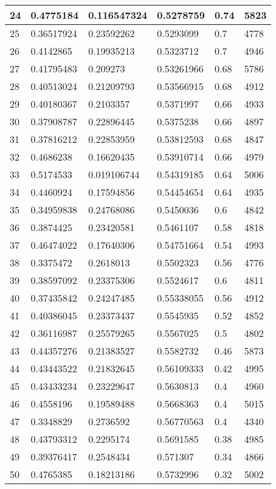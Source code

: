 \begin{longtable}{|l|l|l|l|l|l|}
24 & 0.4775184 & 0.116547324 & 0.5278759 & 0.74 & 5823 \\ \hline 
25 & 0.36517924 & 0.23592262 & 0.5293099 & 0.7 & 4778 \\ \hline 
26 & 0.4142865 & 0.19935213 & 0.5323712 & 0.7 & 4946 \\ \hline 
27 & 0.41795483 & 0.209273 & 0.53261966 & 0.68 & 5786 \\ \hline 
28 & 0.40513024 & 0.21209793 & 0.53566915 & 0.68 & 4912 \\ \hline 
29 & 0.40180367 & 0.2103357 & 0.5371997 & 0.66 & 4933 \\ \hline 
30 & 0.37908787 & 0.22896445 & 0.5375238 & 0.66 & 4897 \\ \hline 
31 & 0.37816212 & 0.22853959 & 0.53812593 & 0.68 & 4847 \\ \hline 
32 & 0.4686238 & 0.16620435 & 0.53910714 & 0.66 & 4979 \\ \hline 
33 & 0.5174533 & 0.019106744 & 0.54319185 & 0.64 & 5006 \\ \hline 
34 & 0.4460924 & 0.17594856 & 0.54454654 & 0.64 & 4935 \\ \hline 
35 & 0.34959838 & 0.24768086 & 0.5450036 & 0.6 & 4842 \\ \hline 
36 & 0.3874425 & 0.23420581 & 0.5461107 & 0.58 & 4818 \\ \hline 
37 & 0.46474022 & 0.17640306 & 0.54751664 & 0.54 & 4993 \\ \hline 
38 & 0.3375472 & 0.2618013 & 0.5502323 & 0.56 & 4776 \\ \hline 
39 & 0.38597092 & 0.23375306 & 0.5524617 & 0.6 & 4811 \\ \hline 
40 & 0.37435842 & 0.24247485 & 0.55338055 & 0.56 & 4912 \\ \hline 
41 & 0.40386045 & 0.23373437 & 0.5545935 & 0.52 & 4852 \\ \hline 
42 & 0.36116987 & 0.25579265 & 0.5567025 & 0.5 & 4802 \\ \hline 
43 & 0.44357276 & 0.21383527 & 0.5582732 & 0.46 & 5873 \\ \hline 
44 & 0.43443522 & 0.21832645 & 0.56109333 & 0.42 & 4995 \\ \hline 
45 & 0.43433234 & 0.23229647 & 0.5630813 & 0.4 & 4960 \\ \hline 
46 & 0.4558196 & 0.19589488 & 0.5668363 & 0.4 & 5015 \\ \hline 
47 & 0.3348829 & 0.2736592 & 0.56770563 & 0.4 & 4340 \\ \hline 
48 & 0.43793312 & 0.2295174 & 0.5691585 & 0.38 & 4985 \\ \hline 
49 & 0.39376417 & 0.2548434 & 0.571307 & 0.34 & 4866 \\ \hline 
50 & 0.4765385 & 0.18213186 & 0.5732996 & 0.32 & 5002 \\ \hline 
\end{longtable}